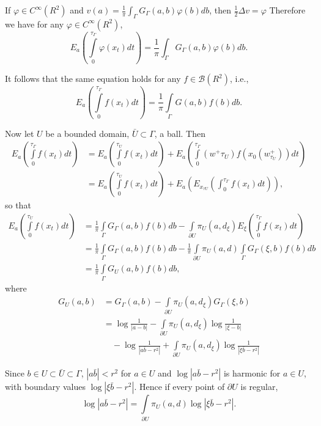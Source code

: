 If $\varphi \in C^{\infty} (R^2)$ and $v(a) = \frac{1}{\pi}
\int_{\Gamma} G_{\Gamma} (a,b) \varphi (b) db$, then $\frac{1}{2}
\Delta v = \varphi$ Therefore we have for any $\varphi \in
C^{\infty} (R^2)$, 
$$
E_a \left(\int\limits^{\tau_\Gamma}_0 \varphi (x_t) dt\right) = \frac{1}{\pi}
\int_{\Gamma} G_{\Gamma} (a,b) \varphi (b) db. 
$$

It follows that the same equation holds for any $f \in \mathcal{B}
(R^2)$, i.e., 
$$ 
E_a \left(\int\limits^{\tau_\Gamma}_0 f(x_{t})dt\right) = \frac{1}{\pi}
\int\limits_{\Gamma} G (a,b)f (b) db. 
$$

Now let $U$ be a bounded domain, $\bar{U} \subset \Gamma$, a ball. Then
\begin{align*}
  E_a \left(\int\limits^{\tau_\Gamma}_0 f (x_t) dt\right) & = E_a
  \left(\int\limits^{\tau_U}_0 f (x_t) dt\right) + E_a
  \left(\int\limits^{\tau_\Gamma}_{0} (w^+ \tau_U) f(x_0
  (w^+_{\tau_U})) dt\right)\\ 
  & = E_a \left(\int\limits^{\tau_U}_0 f (x_t) dt\right) + E_a \left(E_{x_{\tau U}}
  \left(\int^{\tau_\Gamma}_0 f(x_t) dt\right)\right), 
\end{align*}\pageoriginale
so that
{\fontsize{10pt}{12pt}\selectfont
\begin{align*}
E_a  \left(\int\limits^{\tau_U}_0 f (x_t) dt\right)  &= \frac{1}{\pi}
  \int\limits_{\Gamma} G_{\Gamma} (a, b) f (b) db -
  \int\limits_{\partial U} \pi_U (a, d_\xi) E_{\xi}
  \left(\int\limits^{\tau_\Gamma}_{0} f(x_t) dt\right)\\  
  & = \frac{1}{\pi} \int\limits_{\Gamma} G_{\Gamma} (a, b) f (b) db -
  \frac{1}{\pi} \int\limits_{\partial U} \pi_U (a, d) \int\limits_{\Gamma}
  G_{\Gamma} (\xi, b) f(b) db\\ 
  & = \frac{1}{\pi} \int\limits_{\Gamma} G_U (a,b) f (b) db,
\end{align*}}\relax
where
\begin{align*}
  G_U (a,b) &= G_{\Gamma}(a,b) - \int\limits_{\partial U} \pi_{U} (a,
  d_\xi ) G_{\Gamma} (\xi , b)\\ 
  &= \log \frac{1}{|a - b|} - \int\limits_{\partial U} \pi_U (a, d_\xi
  ) \log \frac{1}{|\xi - b|}\\
&\quad - \log \frac{1}{|a \bar{b} - r^2|} + \int\limits_{\partial U} \pi_U (a, d_\xi ) \log \frac{1}{|\xi \bar{b} -r^2|} 
\end{align*}

Since $b \in U \subset \bar{U} \subset \Gamma$, $|a \bar{b}| < r^2$ for
$a \in U$ and $\log | a \bar{b} - r^2 |$ is harmonic for $a \in U$,
with boundary values $\log |\xi \bar{b} - r^2|$. Hence if every point
of $\partial U$ is regular, 
$$
\log  |a \bar{b}- r^2| = \int\limits_{\partial U} \pi_U (a, d) \log
|\xi \bar{b} - r^2|. 
$$

